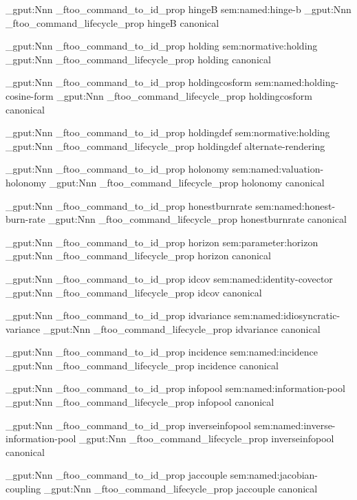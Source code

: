 \prop_gput:Nnn \g_ftoo_command_to_id_prop { hingeB } { sem:named:hinge-b }
\prop_gput:Nnn \g_ftoo_command_lifecycle_prop { hingeB } { canonical }


\prop_gput:Nnn \g_ftoo_command_to_id_prop { holding } { sem:normative:holding }
\prop_gput:Nnn \g_ftoo_command_lifecycle_prop { holding } { canonical }


\prop_gput:Nnn \g_ftoo_command_to_id_prop { holdingcosform } { sem:named:holding-cosine-form }
\prop_gput:Nnn \g_ftoo_command_lifecycle_prop { holdingcosform } { canonical }


\prop_gput:Nnn \g_ftoo_command_to_id_prop { holdingdef } { sem:normative:holding }
\prop_gput:Nnn \g_ftoo_command_lifecycle_prop { holdingdef } { alternate-rendering }


\prop_gput:Nnn \g_ftoo_command_to_id_prop { holonomy } { sem:named:valuation-holonomy }
\prop_gput:Nnn \g_ftoo_command_lifecycle_prop { holonomy } { canonical }


\prop_gput:Nnn \g_ftoo_command_to_id_prop { honestburnrate } { sem:named:honest-burn-rate }
\prop_gput:Nnn \g_ftoo_command_lifecycle_prop { honestburnrate } { canonical }


\prop_gput:Nnn \g_ftoo_command_to_id_prop { horizon } { sem:parameter:horizon }
\prop_gput:Nnn \g_ftoo_command_lifecycle_prop { horizon } { canonical }


\prop_gput:Nnn \g_ftoo_command_to_id_prop { idcov } { sem:named:identity-covector }
\prop_gput:Nnn \g_ftoo_command_lifecycle_prop { idcov } { canonical }


\prop_gput:Nnn \g_ftoo_command_to_id_prop { idvariance } { sem:named:idiosyncratic-variance }
\prop_gput:Nnn \g_ftoo_command_lifecycle_prop { idvariance } { canonical }


\prop_gput:Nnn \g_ftoo_command_to_id_prop { incidence } { sem:named:incidence }
\prop_gput:Nnn \g_ftoo_command_lifecycle_prop { incidence } { canonical }


\prop_gput:Nnn \g_ftoo_command_to_id_prop { infopool } { sem:named:information-pool }
\prop_gput:Nnn \g_ftoo_command_lifecycle_prop { infopool } { canonical }


\prop_gput:Nnn \g_ftoo_command_to_id_prop { inverseinfopool } { sem:named:inverse-information-pool }
\prop_gput:Nnn \g_ftoo_command_lifecycle_prop { inverseinfopool } { canonical }


\prop_gput:Nnn \g_ftoo_command_to_id_prop { jaccouple } { sem:named:jacobian-coupling }
\prop_gput:Nnn \g_ftoo_command_lifecycle_prop { jaccouple } { canonical }



